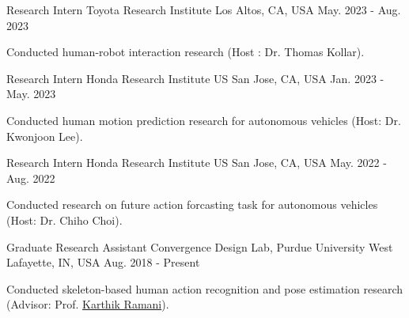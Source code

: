 


\begin{cventries}

\cventry
{Research Intern} %
{Toyota Research Institute} %
{Los Altos, CA, USA} %
{May. 2023 - Aug. 2023} %
{ %
\begin{cvitems}
\item {Conducted human-robot interaction research (Host : Dr. Thomas Kollar).}
\end{cvitems}
}
\vspace{-.5em}


\cventry
{Research Intern} %
{Honda Research Institute US} %
{San Jose, CA, USA} %
{Jan. 2023 - May. 2023} %
{ %
\begin{cvitems}
\item {Conducted human motion prediction research for autonomous vehicles (Host: Dr. Kwonjoon Lee).}
\end{cvitems}
}
\vspace{-.5em}

\cventry
{Research Intern} %
{Honda Research Institute US} %
{San Jose, CA, USA} %
{May. 2022 - Aug. 2022} %
{ %
\begin{cvitems}
\item {Conducted research on future action forcasting task for autonomous vehicles (Host: Dr. Chiho Choi).}
\end{cvitems}
}
\vspace{-.5em}

\cventry
{Graduate Research Assistant} %
{Convergence Design Lab, Purdue University} %
{West Lafayette, IN, USA} %
{Aug. 2018 - Present} %
{ %
\begin{cvitems}
\item {Conducted skeleton-based human action recognition and pose estimation research (Advisor: Prof. \href{https://engineering.purdue.edu/~ramani/wordpress/about/}{Karthik Ramani}).}
\end{cvitems}
}
\vspace{-.5em}


\end{cventries}
